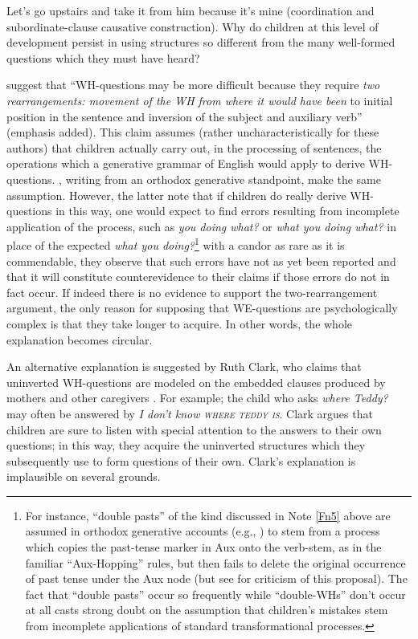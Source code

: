 \ea\label{ex:3:57}
 Let's go upstairs and take it from him because it's mine (coordination and subordinate-clause causative construction). 
\z
Why do children at this level of development persist in using structures so different from the many well-formed questions which they must have heard?

\citet[354]{ClarkEtAl1977} suggest that ``WH-questions may be more difficult because they require \textit{two rearrangements: movement of the WH from where it would have been} to initial position in the sentence and inversion of the subject and auxiliary verb'' (emphasis added). This claim assumes (rather uncharacteristically for these authors) that children actually carry out, in the processing of sentences, the operations which a generative grammar of English would apply to derive WH-questions. \citet{ErreichEtAl1980}, writing from an orthodox generative standpoint, make the same assumption. However, the latter note that if children do really derive WH-questions in this way, one would expect to find errors resulting from incomplete application of the process, such as \textit{you doing what?} or \textit{what you doing what?} in place of the expected \textit{what you doing?}\footnote{For instance, ``double pasts'' of the kind discussed in Note \ref{Fn5} above are assumed in orthodox generative accounts (e.g., \citealt{Hurford1975}) to stem from a process which copies the past-tense marker in Aux onto the verb-stem, as in the familiar ``Aux-Hopping'' rules, but then fails to delete the original occurrence of past tense under the Aux node (but see \citet{MaratsosEtAl1978} for criticism of this proposal). The fact that ``double pasts'' occur so frequently while ``double-WHs'' don't occur at all casts strong doubt on the assumption that children's mistakes stem from incomplete applications of standard transformational processes.} with a candor as rare as it is commendable, they observe that such errors have not as yet been reported and that it will constitute counterevidence to their claims if those errors do not in fact occur. If indeed there is no evidence to support the two-rearrangement argument, the only reason for supposing that WE-questions are psychologically complex is that they take longer to acquire. In other words, the whole explanation becomes circular.

An alternative explanation is suggested by Ruth Clark, who claims that uninverted WH-questions are modeled on the embedded clauses produced by mothers and other caregivers \citep{Clark1977}. For example; the child who asks \textit{where Teddy?} may often be answered by \textit{I don't know \textsc{where teddy is}}. Clark argues that children are sure to listen with special attention to the answers to their own questions; in this way, they acquire the uninverted structures which they subsequently use to form questions of their own. Clark's explanation is implausible on several grounds.

